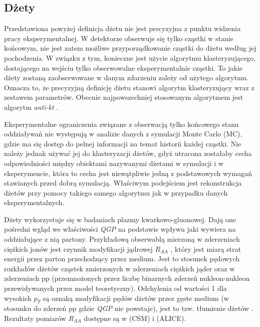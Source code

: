 \subsection{Dżety}
\label{subsec:dzet-def}

Przedstawiona powyżej definicja dżetu nie jest precyzyjna z punktu widzenia pracy eksperymentalnej. W detektorze obserwuje się tylko cząstki w stanie końcowym, nie jest zatem możliwe przyporządkowanie cząstki do dżetu według jej pochodzenia. W związku z tym, konieczne jest użycie algorytmu klasteryzującego, dostającego na wejściu tylko obserwowalne eksperymentalnie cząstki. 
To jakie dżety zostaną zaobserwowane w danym zdarzeniu zależy od użytego algorytmu. Oznacza to, że precyzyjną definicję dżetu stanowi algorytm klasteryzujący wraz z zestawem parametrów. Obecnie najpowszechniej stosowanym algorytmem jest algorytm \textit{anti-kt} \cite{Cacciari:2008gp}.





Eksperymentalne ograniczenia związane z obserwacją tylko końcowego stanu oddziaływań nie występują w analizie danych z symulacji Monte Carlo (MC), gdzie ma się dostęp do pełnej informacji na temat historii każdej cząstki. 
Nie należy jednak używać jej do klasteryzacji dżetów, gdyż utracona zostałaby cecha odpowiedniości między obiektami nazywanymi dżetami w symulacji i w eksperymencie, która to cecha jest niewątpliwie jedną z podstawowych wymagań stawianych przed dobrą symulacją. Właściwym podejściem jest rekonstrukcja dżetów przy pomocy takiego samego algorytmu jak w przypadku danych eksperymentalnych.

Dżety wykorzystuje się w badaniach plazmy kwarkowo-gluonowej.
Dają one pośredni wgląd we właściwości \textit{QGP} na podstawie wpływu jaki wywiera na oddziałujące z nią partony. 
Przykładową obserwablą mierzoną w zderzeniach ciężkich jonów jest czynnik modyfikacji jądrowej $R_{AA}$ , który jest miarą strat energii przez parton przechodzący przez medium. Jest to stosunek pędowych rozkładów dżetów cząstek zmierzonych w zderzeniach ciężkich jąder oraz w zderzeniach pp (przemnożonych przez liczbę binarnych zderzeń nukleon-nukleon przewidywanych przez model teoretyczny). Odchylenia od wartości 1 dla wysokich $p_T$ są oznaką modyfikacji pędów dżetów przez gęste medium (w stosunku do zderzeń pp gdzie \textit{QGP} nie powstaje), jest to tzw. tłumienie dżetów . Rezultaty pomiarów $R_{AA}$ dostępne są w \cite{Khachatryan:2016odn} (CSM) i \cite{Abelev:2012hxa} (ALICE).

